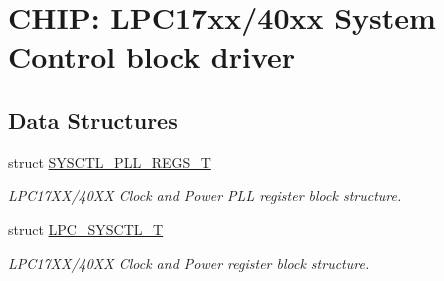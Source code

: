 \hypertarget{group__SYSCTL__17XX__40XX}{\section{C\-H\-I\-P\-: L\-P\-C17xx/40xx System Control block driver}
\label{group__SYSCTL__17XX__40XX}
}
\subsection*{Data Structures}
\begin{DoxyCompactItemize}
\item 
struct \hyperlink{structSYSCTL__PLL__REGS__T}{S\-Y\-S\-C\-T\-L\-\_\-\-P\-L\-L\-\_\-\-R\-E\-G\-S\-\_\-\-T}
\begin{DoxyCompactList}\small\item\em L\-P\-C17\-X\-X/40\-X\-X Clock and Power P\-L\-L register block structure. \end{DoxyCompactList}\item 
struct \hyperlink{structLPC__SYSCTL__T}{L\-P\-C\-\_\-\-S\-Y\-S\-C\-T\-L\-\_\-\-T}
\begin{DoxyCompactList}\small\item\em L\-P\-C17\-X\-X/40\-X\-X Clock and Power register block structure. \end{DoxyCompactList}\end{DoxyCompactItemize}
